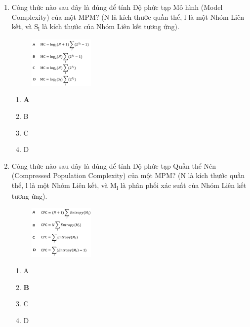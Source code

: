 \documentclass{book}
\begin{document}
\begin{enumerate}
    \item Công thức nào sau đây là đúng để tính Độ phức tạp Mô hình (Model Complexity) của một MPM? (N là kích thước quần thể, l là một Nhóm Liên kết, và S\textsubscript{l} là kích thước của Nhóm Liên kết tương ứng).
    \begin{figure}[H]
        \centering
        \includegraphics[width=0.3\textwidth]{images/quiz5_7.png}
    \end{figure}
    \begin{multicols}{2}
        \begin{enumerate}[label=\Alph*]
            \item \textbf{A}
            \item B
            \item C
            \item D
        \end{enumerate}
    \end{multicols}

    \item Công thức nào sau đây là đúng để tính Độ phức tạp Quần thể Nén (Compressed Population Complexity) của một MPM? (N là kích thước quần thể, l là một Nhóm Liên kết, và M\textsubscript{l} là phân phối xác suất của Nhóm Liên kết tương ứng).
    \begin{figure}[H]
        \centering
        \includegraphics[width=0.3\textwidth]{images/quiz5_8.png}
    \end{figure}
    \begin{multicols}{2}
        \begin{enumerate}[label=\Alph*]
            \item A
            \item \textbf{B}
            \item C
            \item D
        \end{enumerate}
    \end{multicols}


\end{enumerate}
\end{document}
